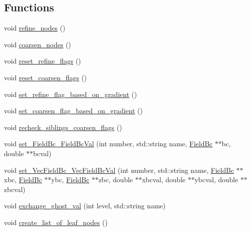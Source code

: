 \subsection*{Functions}
\begin{DoxyCompactItemize}
\item 
void \hyperlink{namespacemy_octree_a95aa7c057f422339a637c562d44cc8c3}{refine\+\_\+nodes} ()
\item 
void \hyperlink{namespacemy_octree_a3291436baca64cc95a96382005387d9c}{coarsen\+\_\+nodes} ()
\item 
void \hyperlink{namespacemy_octree_a0c3c29a8912f8df207aef95726ef6ac1}{reset\+\_\+refine\+\_\+flags} ()
\item 
void \hyperlink{namespacemy_octree_ab23bf801e0b1f22a8267e8297bb82e3a}{reset\+\_\+coarsen\+\_\+flags} ()
\item 
void \hyperlink{namespacemy_octree_a138c0d9de9f281e8181aa8d49093548c}{set\+\_\+refine\+\_\+flag\+\_\+based\+\_\+on\+\_\+gradient} ()
\item 
void \hyperlink{namespacemy_octree_ae7c384b5319debc89a2a93e51c2e49f5}{set\+\_\+coarsen\+\_\+flag\+\_\+based\+\_\+on\+\_\+gradient} ()
\item 
void \hyperlink{namespacemy_octree_ae994752c4c1f05296224168a55162509}{recheck\+\_\+siblings\+\_\+coarsen\+\_\+flags} ()
\item 
void \hyperlink{namespacemy_octree_aff17e18e2993c0f76b75dc0150e628d6}{set\+\_\+\+Field\+Bc\+\_\+\+Field\+Bc\+Val} (int number, std\+::string name, \hyperlink{namespacemy_octree_a1b5634e126358fc57232cfc9e6d96ad9}{Field\+Bc} $\ast$$\ast$bc, double $\ast$$\ast$bcval)
\item 
void \hyperlink{namespacemy_octree_ab905564565987eeb295c68781bb73ccc}{set\+\_\+\+Vec\+Field\+Bc\+\_\+\+Vec\+Field\+Bc\+Val} (int number, std\+::string name, \hyperlink{namespacemy_octree_a1b5634e126358fc57232cfc9e6d96ad9}{Field\+Bc} $\ast$$\ast$xbc, \hyperlink{namespacemy_octree_a1b5634e126358fc57232cfc9e6d96ad9}{Field\+Bc} $\ast$$\ast$ybc, \hyperlink{namespacemy_octree_a1b5634e126358fc57232cfc9e6d96ad9}{Field\+Bc} $\ast$$\ast$zbc, double $\ast$$\ast$xbcval, double $\ast$$\ast$ybcval, double $\ast$$\ast$zbcval)
\item 
void \hyperlink{namespacemy_octree_a7e8eab5c7cd2aedf967f4eb2ae10c4e9}{exchange\+\_\+ghost\+\_\+val} (int level, std\+::string name)
\item 
void \hyperlink{namespacemy_octree_a741060f7071defd75bef2cfdfa7ab034}{create\+\_\+list\+\_\+of\+\_\+leaf\+\_\+nodes} ()
\item 

\end{DoxyCompactItemize}

